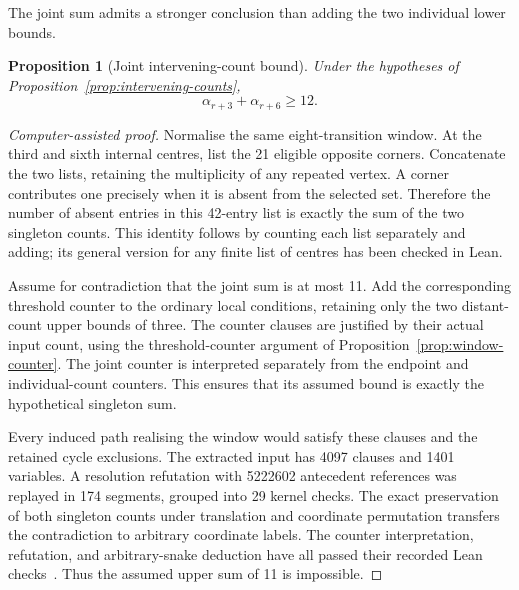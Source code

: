 \documentclass[11pt,a4paper]{article}
\newtheorem{proposition}[theorem]{Proposition}
\theoremstyle{definition}
\theoremstyle{remark}
\begin{document}
The joint sum admits a stronger conclusion than adding the two individual lower bounds.

\begin{proposition}[Joint intervening-count bound]\label{prop:joint-intervening}
Under the hypotheses of Proposition~\ref{prop:intervening-counts},
\[
\alpha_{r+3}+\alpha_{r+6}\ge12.
\]
\end{proposition}
\begin{proof}[Computer-assisted proof]
Normalise the same eight-transition window. At the third and sixth internal centres, list the 21 eligible opposite corners. Concatenate the two lists, retaining the multiplicity of any repeated vertex. A corner contributes one precisely when it is absent from the selected set. Therefore the number of absent entries in this 42-entry list is exactly the sum of the two singleton counts. This identity follows by counting each list separately and adding; its general version for any finite list of centres has been checked in Lean.

Assume for contradiction that the joint sum is at most 11. Add the corresponding threshold counter to the ordinary local conditions, retaining only the two distant-count upper bounds of three. The counter clauses are justified by their actual input count, using the threshold-counter argument of Proposition~\ref{prop:window-counter}. The joint counter is interpreted separately from the endpoint and individual-count counters. This ensures that its assumed bound is exactly the hypothetical singleton sum.

Every induced path realising the window would satisfy these clauses and the retained cycle exclusions. The extracted input has 4097 clauses and 1401 variables. A resolution refutation with 5222602 antecedent references was replayed in 174 segments, grouped into 29 kernel checks. The exact preservation of both singleton counts under translation and coordinate permutation transfers the contradiction to arbitrary coordinate labels. The counter interpretation, refutation, and arbitrary-snake deduction have all passed their recorded Lean checks~\cite{jointinterveningarchive}. Thus the assumed upper sum of 11 is impossible.
\end{proof}
\end{document}

